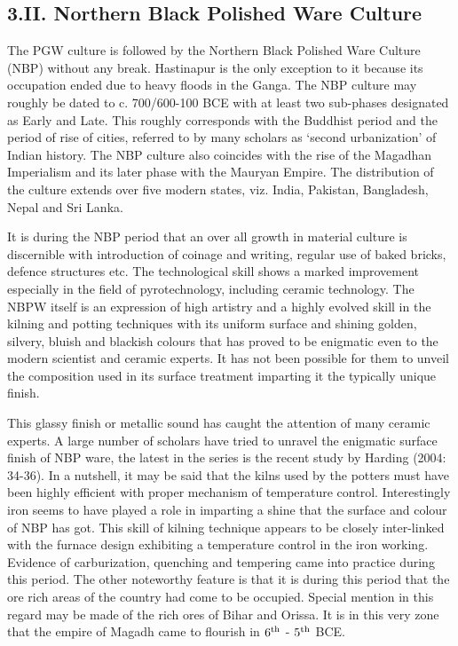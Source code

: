 \subsection*{3.II. Northern Black Polished Ware Culture}\label{subsection-9}

The PGW culture is followed by the Northern Black Polished Ware Culture (NBP) without any break. Hastinapur is the only exception to it because its occupation ended due to heavy floods in the Ganga. The NBP culture may roughly be dated to c. 700/600-100 BCE with at least two sub-phases designated as Early and Late. This roughly corresponds with the Buddhist period and the period of rise of cities, referred to by many scholars as `second urbanization' of Indian history. The NBP culture also coincides with the rise of the Magadhan Imperialism and its later phase with the Mauryan Empire. The distribution of the culture extends over five modern states, viz. India, Pakistan, Bangladesh, Nepal and Sri Lanka.

It is during the NBP period that an over all growth in material culture is discernible with introduction of coinage and writing, regular use of baked bricks, defence structures etc. The technological skill shows a marked improvement especially in the field of pyrotechnology, including ceramic technology. The NBPW itself is an expression of high artistry and a highly evolved skill in the kilning and potting techniques with its uniform surface and shining golden, silvery, bluish and blackish colours that has proved to be enigmatic even to the modern scientist and ceramic experts. It has not been possible for them to unveil the composition used in its surface treatment imparting it the typically unique finish.

This glassy finish or metallic sound has caught the attention of many ceramic experts. A large number of scholars have tried to unravel the enigmatic surface finish of NBP ware, the latest in the series is the recent study by Harding (2004: 34-36). In a nutshell, it may be said that the kilns used by the potters must have been highly efficient with proper mechanism of temperature control. Interestingly iron seems to have played a role in imparting a shine that the surface and colour of NBP has got.  This skill of kilning technique appears to be closely inter-linked with the furnace design exhibiting a temperature control in the iron working. Evidence of carburization, quenching and tempering came into practice during this period. The other noteworthy feature is that it is during this period that the ore rich areas of the country had come to be occupied. Special mention in this regard may be made of the rich ores of Bihar and Orissa. It is in this very zone that the empire of Magadh came to flourish in $6^{\rm th}$ - $5^{\rm th}$ BCE.

